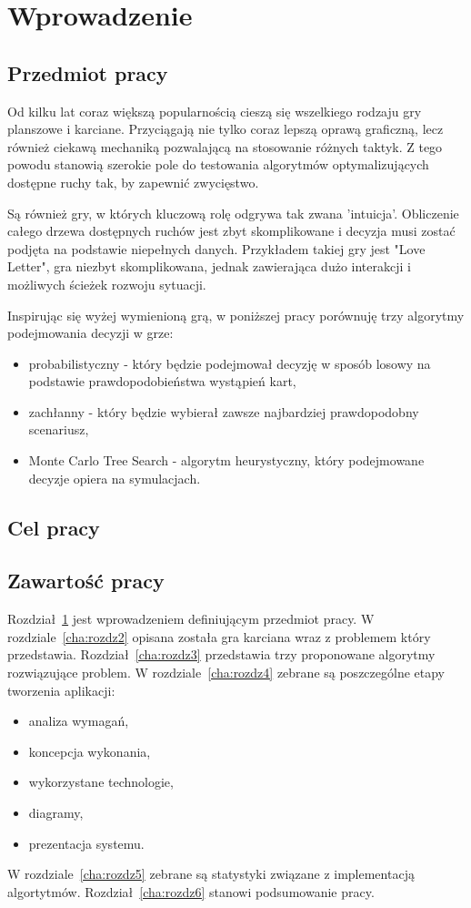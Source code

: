 \chapter{Wprowadzenie}
\label{cha:rozdz1}
\section{Przedmiot pracy}
\label{sec:przedmiotPracy}

Od kilku lat coraz większą popularnością cieszą się wszelkiego rodzaju gry planszowe i karciane. Przyciągają nie tylko coraz lepszą oprawą graficzną, lecz również ciekawą mechaniką pozwalającą na stosowanie różnych taktyk. Z tego powodu stanowią szerokie pole do testowania algorytmów optymalizujących dostępne ruchy tak, by zapewnić zwycięstwo.

Są również gry, w których kluczową rolę odgrywa tak zwana 'intuicja'. Obliczenie całego drzewa dostępnych ruchów jest zbyt skomplikowane i decyzja musi zostać podjęta na podstawie niepełnych danych. Przykładem takiej gry jest "Love Letter", gra niezbyt skomplikowana, jednak zawierająca dużo interakcji i możliwych ścieżek rozwoju sytuacji.

Inspirując się wyżej wymienioną grą, w poniższej pracy porównuję trzy algorytmy podejmowania decyzji w grze:
\begin{itemize}
\item
probabilistyczny - który będzie podejmował decyzję w sposób losowy na podstawie prawdopodobieństwa wystąpień kart,
\item
zachłanny - który będzie wybierał zawsze najbardziej prawdopodobny scenariusz,
\item
Monte Carlo Tree Search - algorytm heurystyczny, który podejmowane decyzje opiera na symulacjach.
\end{itemize} 

\section{Cel pracy}
\label{sec:zawartoscPracy}

\section{Zawartość pracy}
\label{sec:zawartoscPracy}

Rozdział~\ref{cha:rozdz1} jest wprowadzeniem definiującym przedmiot pracy. W rozdziale~\ref{cha:rozdz2} opisana została gra karciana wraz z problemem który przedstawia. Rozdział~\ref{cha:rozdz3} przedstawia trzy proponowane algorytmy rozwiązujące problem. W rozdziale~\ref{cha:rozdz4} zebrane są poszczególne etapy tworzenia aplikacji:
\begin{itemize}
\item
analiza wymagań,
\item
koncepcja wykonania,
\item
wykorzystane technologie,
\item
diagramy,
\item
prezentacja systemu.
\end{itemize} 

W rozdziale~\ref{cha:rozdz5} zebrane są statystyki związane z implementacją algortytmów. Rozdział~\ref{cha:rozdz6} stanowi podsumowanie pracy.